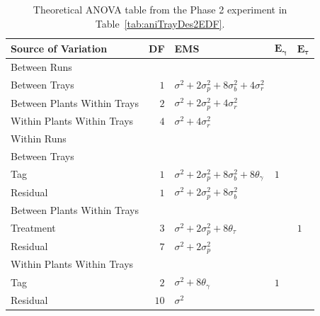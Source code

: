 \begin{table}[!ht]
 \caption{Theoretical ANOVA table from the Phase 2 experiment in Table~\ref{tab:aniTrayDes2EDF}.}
 \begin{tabular}[t]{lrlll} 
 \toprule 
 \multicolumn{1}{l}{\textbf{Source of Variation}} & \multicolumn{1}{l}{\textbf{DF}} & \multicolumn{1}{l}{\textbf{EMS}}& \multicolumn{1}{l}{$\bm{E_{\gamma}}$}&\multicolumn{1}{l}{$\bm{E_{\tau}}$}\\ 
 \midrule 
 Between Runs &  &  & & \\ 
 \quad Between Trays & $1$ & $\sigma^2+2\sigma_{p}^2+8\sigma_{b}^2+4\sigma_{r}^2$ & & \\  
 \quad Between Plants Within Trays & $2$ & $\sigma^2+2\sigma_{p}^2+4\sigma_{r}^2$ & & \\  
 \quad Within Plants Within Trays & $4$ & $\sigma^2+4\sigma_{r}^2$ & & \\ \hline 
 Within Runs &  &  & & \\ 
 \quad Between Trays &  &  & & \\ 
 \quad \quad Tag & $1$ & $\sigma^2+2\sigma_{p}^2+8\sigma_{b}^2+8\theta_{\gamma}$ &$1$ & \\ 
 \quad \quad Residual & $1$ & $\sigma^2+2\sigma_{p}^2+8\sigma_{b}^2$ & & \\ \hline 
 \quad Between Plants Within Trays &  &  & & \\ 
 \quad \quad Treatment & $3$ & $\sigma^2+2\sigma_{p}^2+8\theta_{\tau}$ & & $1$\\ 
 \quad \quad Residual & $7$ & $\sigma^2+2\sigma_{p}^2$ & & \\ \hline 
 \quad Within Plants Within Trays &  &  & & \\ 
 \quad \quad Tag & $2$ & $\sigma^2+8\theta_{\gamma}$ &$1$ & \\ 
 \quad \quad Residual & $10$ & $\sigma^2$ & & \\ 
 \bottomrule 
 \end{tabular} 
 \label{tab:ANOVAPhase1RCBD2} 
\end{table} 

